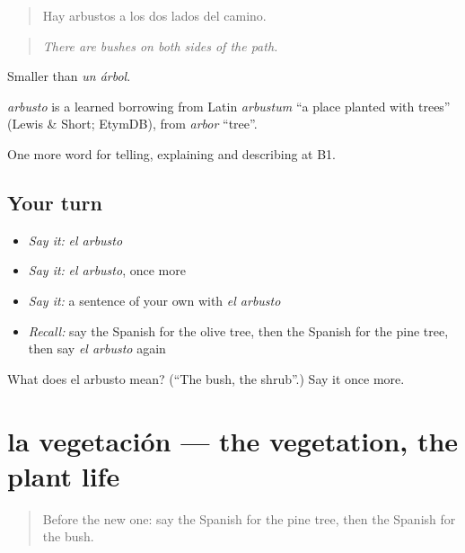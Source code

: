 \begin{quote}
Hay arbustos a los dos lados del camino.
\end{quote}

\begin{quote}
\emph{There are bushes on both sides of the path.}
\end{quote}

Smaller than \emph{un árbol}.

\begin{cousinweb}
\emph{arbusto} is a learned borrowing from Latin \emph{arbustum} \textquotedblleft{}a place planted with trees\textquotedblright{} (Lewis \& Short; EtymDB), from \emph{arbor} \textquotedblleft{}tree\textquotedblright{}.
\end{cousinweb}

\begin{grammarlens}[title={What you've built}]
One more word for telling, explaining and describing at B1.
\end{grammarlens}

\subsection*{Your turn}
\begin{itemize}
\raggedright
  \item \emph{Say it:} \emph{el arbusto}
  \item \emph{Say it:} \emph{el arbusto}, once more
  \item \emph{Say it:} a sentence of your own with \emph{el arbusto}
  \item \emph{Recall:} say the Spanish for the olive tree, then the Spanish for the pine tree, then say \emph{el arbusto} again
\end{itemize}

\begin{tcolorbox}[breakable,colback=teal!4,colframe=teal!35!black,title={Before you move on}]
What does el arbusto mean? (\textquotedblleft{}The bush, the shrub\textquotedblright{}.) Say it once more.
\end{tcolorbox}
\section[la vegetación]{la vegetación — the vegetation, the plant life}

\label{lesson:ES-C693-vegetacion}



\begin{quote}
Before the new one: say the Spanish for the pine tree, then the Spanish for the bush.
\end{quote}

